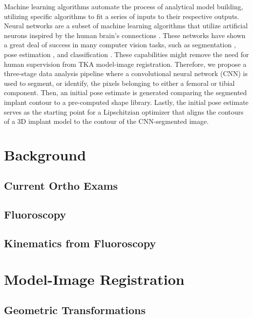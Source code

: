 Machine learning algorithms automate the process of analytical model building, utilizing specific algorithms to fit a series of inputs to their respective outputs. Neural networks are a subset of machine learning algorithms that utilize artificial neurons inspired by the human brain’s connections \cite{marrEarlyProcessingVisual1976}. These networks have shown a great deal of success in many computer vision tasks, such as segmentation \cite{chanHistoSegNetSemanticSegmentation2019,wangDeepHighResolutionRepresentation2020,ronnebergerUNetConvolutionalNetworks2015}, pose estimation \cite{wuDeepGraphPose2020,kendallGeometricLossFunctions2017}, and classification \cite{krizhevskyImageNetClassificationDeep2017,qiPointNetDeepHierarchical2017,qiPointNetDeepLearning2017}. These capabilities might remove the need for human supervision from TKA model-image registration. Therefore, we propose a three-stage data analysis pipeline where a convolutional neural network (CNN) is used to segment, or identify, the pixels belonging to either a femoral or tibial component. Then, an initial pose estimate is generated comparing the segmented implant contour to a pre-computed shape library. Lastly, the initial pose estimate serves as the starting point for a Lipschitzian optimizer that aligns the contours of a 3D implant model to the contour of the CNN-segmented image.

\section{Background}
\subsection{Current Ortho Exams}

\subsection{Fluoroscopy}

\subsection{Kinematics from Fluoroscopy}


\section{Model-Image Registration}
\subsection{Geometric Transformations}

